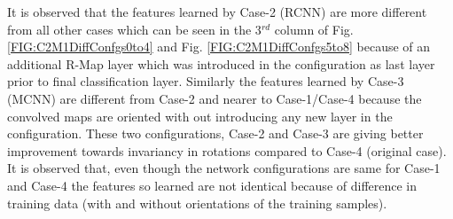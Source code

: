 It is observed that the features learned by Case-2 (RCNN) are more different from all other cases which can be seen in the 3$^{rd}$ column of Fig. \ref{FIG:C2M1DiffConfgs0to4} and Fig. \ref{FIG:C2M1DiffConfgs5to8} because of an additional R-Map layer which was introduced in the configuration as last layer prior to final classification layer. Similarly the features learned by Case-3 (MCNN) are different from Case-2 and nearer to Case-1/Case-4 because the convolved maps are oriented with out introducing any new layer in the configuration. These two configurations, Case-2 and Case-3 are giving better improvement towards invariancy in rotations compared to Case-4 (original case). It is observed that, even though the network configurations are same for Case-1 and Case-4 the features so learned are not identical because of difference in training data (with and without orientations of the training samples). 
